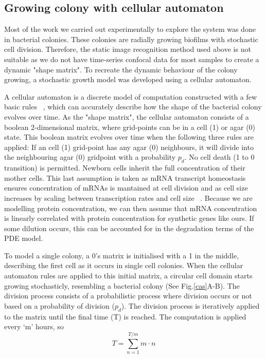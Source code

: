 \subsection{Growing colony with cellular automaton}
Most of the work we carried out experimentally to explore the system was done in bacterial colonies.
These colonies are radially growing biofilms with stochastic cell division.
Therefore, the static image recognition method used above is not suitable as we do not have time-series confocal data for most samples to create a dynamic "shape matrix".
To recreate the dynamic behaviour of the colony growing, a stochastic growth model was developed using a cellular automaton.

A cellular automaton is a discrete model of computation constructed with a few basic rules ~\parencite{gardner1970mathematical}, which can accurately describe how the shape of the bacterial colony evolves over time.
As the "shape matrix", the cellular automaton consists of a boolean 2-dimensional matrix, where grid-points can be in a cell (1) or agar (0) state.
This boolean matrix evolves over time when the following three rules are applied: If an cell (1) grid-point has any agar (0) neighbours, it will divide into the neighbouring agar (0) gridpoint with a probability $p_{d}$.
No cell death (1 to 0 transition) is permitted.
Newborn cells inherit the full concentration of their mother cells.
This last assumption is taken as mRNA transcript homeostasis ensures concentration of mRNAs is mantained at cell division and as cell size increases by scaling between transcription rates and cell size ~\parencite{berry2022mechanisms,volteras2023global}.
Because we are modelling protein concentration, we can then assume that mRNA concentration is linearly correlated with protein concentration for synthetic genes like ours.
If some dilution occurs, this can be accounted for in the degradation terms of the PDE model.

To model a single colony, a 0's matrix is initialised with a 1 in the middle, describing the first cell as it occurs in single cell colonies.
When the cellular automaton rules are applied to this initial matrix, a circular cell domain starts growing stochasticly, resembling a bacterial colony (See Fig.\ref{cas}A-B).
The division process consists of a probabilistic process where division occurs or not based on a probability of division ($p_{d}$).
The division process is iteratively applied to the matrix until the final time (T) is reached.
The computation is applied every ‘m’ hours, so
\begin{equation}
        T = \sum_{n=1}^{T/m} m\cdot n
\end{equation}

